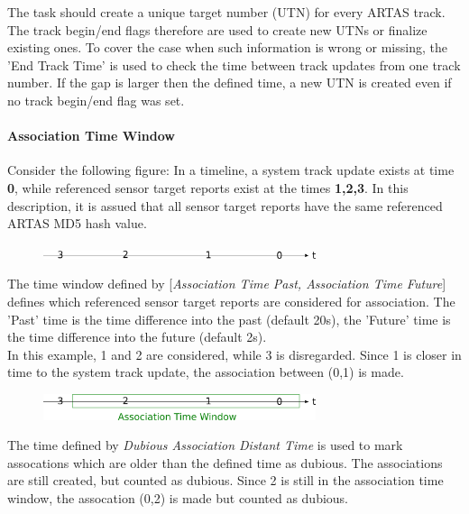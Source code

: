 The task should create a unique target number (UTN) for every ARTAS track. The track begin/end flags therefore are used to create new UTNs or finalize existing ones. To cover the case when such information is wrong or missing, the 'End Track Time' is used to check the time between track updates from one track number. If the gap is larger then the defined time, a new UTN is created even if no track begin/end flag was set.

\paragraph{Association Time Window}

Consider the following figure: In a timeline, a system track update exists at time \textbf{0}, while referenced sensor target reports exist at the times \textbf{1,2,3}. In this description, it is assued that all sensor target reports have the same referenced ARTAS MD5 hash value.


\begin{figure}[H]
  \center
    \includegraphics[width=8cm]{figures/artas_assoc_timeline.png}
\end{figure}


The time window defined by [\textit{Association Time Past, Association Time Future}] defines which referenced sensor target reports are considered for association. The 'Past' time is the time difference into the past (default 20s), the 'Future' time is the time difference into the future (default 2s). \\

In this example, 1 and 2 are considered, while 3 is disregarded. Since 1 is closer in time to the system track update, the association between (0,1) is made.

\begin{figure}[H]
  \center
    \includegraphics[width=8cm]{figures/artas_assoc_window.png}
\end{figure}

The time defined by \textit{Dubious Association Distant Time} is used to mark assocations which are older than the defined time as dubious. The associations are still created, but counted as dubious. Since 2 is still in the association time window, the assocation (0,2) is made but counted as dubious.

